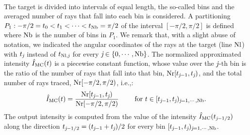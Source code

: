 \\ \indent The target is divided into intervals of equal length, the so-called bins and the averaged number of rays that fall into each bin is considered. A partitioning
$P_1: -\pi/2 = t_{0}<t_{1}<\cdots <t_{\textrm{Nb}}=\pi/2$ of the interval $[-\pi/2, \pi/2]$ is defined where $\textrm{Nb}$ is the number of bins in $P_1$.
We remark that, with a slight abuse of notation, we indicated the angular coordinates of the rays at the target (line $\textrm{Nl}$) with $t_{\textit{j}}$ instead of $t_{\textrm{Nl},\textit{j}}$ for every $\textit{j}\in\{0, \cdots, \textrm{Nb}\}$. 
The normalized approximated intensity $\hat{I}_{\textrm{MC}}(t)$ is a piecewise constant function, whose value over the $\textit{j}$-th bin is the ratio of the number of rays that fall into that bin,
$\textrm{Nr}[t_{\textit{j}-1},t_{\textit{j}})$, and the total number of rays traced, $\textrm{Nr}[-\pi/2, \pi/2)$, i.e.,:
\begin{equation} \label{g_mc}
\hat{I}_{\textrm{MC}}(t) = \frac{\textrm{Nr}[t_{\textit{j}-1},t_{\textit{j}})}{\textrm{Nr}[-\pi/2, \pi/2)} \qquad \mbox{ for } t\in[t_{\textit{j}-1}, t_{\textit{j}})_{\textit{j}=1, \cdots, \textrm{Nb}}.
\end{equation}
The output intensity is computed from the value of the intensity $\hat{I}_{\textrm{MC}}(t_{\textit{j}-1/2})$ along the direction $t_{\textit{j}-1/2}=(t_{\textit{j}-1}+
t_{\textit{j}})/2$ for every bin $[t_{\textit{j}-1},t_{\textit{j}})_{\textit{j} = 1, \cdots, \textrm{Nb}}$.

